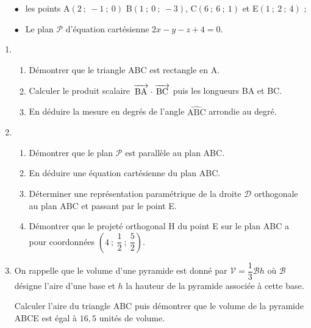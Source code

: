\documentclass[10pt,a4paper]{article}
\newcommand{\vect}[1]{\overrightarrow{\,\mathstrut#1\,}}
\begin{document}
\setlength\parindent{1cm}
\begin{itemize}
\item[$\bullet~~$]les points A$(2~;~-1~;~0)$ B$(1~;~0~;~- 3)$, C$(6~;~6~;~1)$  et E$(1~;~2~;~4)$ ;
\item[$\bullet~~$]Le plan $\mathcal{P}$ d'équation cartésienne $2x - y - z + 4 = 0$.
\end{itemize}
\setlength\parindent{0cm}

\medskip

\begin{enumerate}
\item
	\begin{enumerate}
		\item Démontrer que le triangle ABC est rectangle en A.
		\item Calculer le produit scalaire $\vect{\text{BA}} \cdot \vect{\text{BC}}$ puis les longueurs BA et BC.
		\item En déduire la mesure en degrés de l'angle $\widehat{\text{ABC}}$ arrondie au degré.
	\end{enumerate}
\item
	\begin{enumerate}
		\item Démontrer que le plan $\mathcal{P}$ est parallèle au plan ABC.
		\item En déduire une équation cartésienne du plan ABC.
		\item Déterminer une représentation paramétrique de la droite $\mathcal{D}$ orthogonale au plan ABC et passant par le point E.
		\item Démontrer que le projeté orthogonal H  du point E sur le plan ABC a pour coordonnées $\left(4~;~\dfrac{1}{2}~;~\dfrac{5}{2}\right)$.
	\end{enumerate}
\item On rappelle que le volume d'une pyramide est donné par $\mathcal{V} = \dfrac13 \mathcal{B}h$ où $\mathcal{B}$ désigne l'aire d'une base et $h$  la hauteur de la pyramide associée à cette base.

Calculer l'aire du triangle ABC puis démontrer que le volume de la pyramide ABCE est égal à $16,5$ unités de volume.
\end{enumerate}
\newpage
\hypertarget{Polynesie2}{}

\label{Polynesie2}

\pagestyle{fancy}
\thispagestyle{empty}
\end{document}
